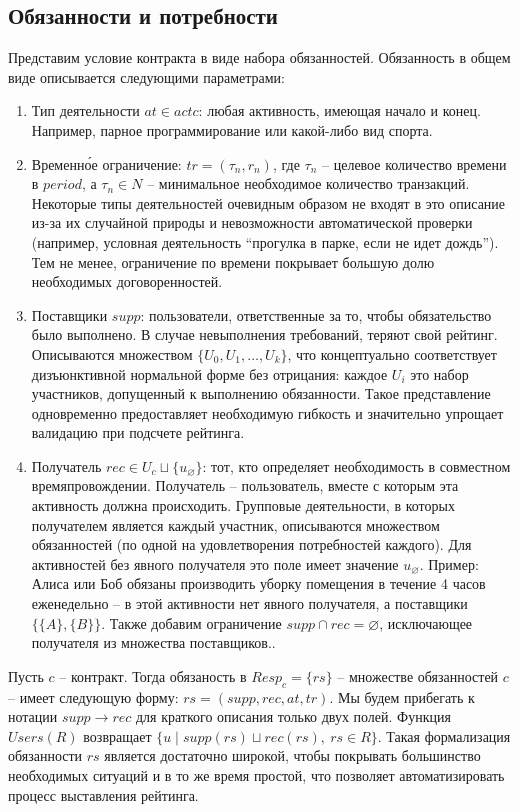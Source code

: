\documentclass[specification,annotation]{itmo-student-thesis}
\begin{document}
\subsection{Обязанности и потребности}

Представим условие контракта в виде набора обязанностей. Обязанность в
общем виде описывается следующими параметрами:

\begin{enumerate}
\item Тип деятельности $at \in actc$: любая активность, имеющая начало
  и конец. Например, парное программирование или какой-либо вид
  спорта.
\item Временн\'{о}е ограничение: $tr = (\tau_n, r_n)$, где $\tau_n$ --
  целевое количество времени в $period$, а $\tau_n \in N$ --
  минимальное необходимое количество транзакций. Некоторые типы
  деятельностей очевидным образом не входят в это описание из-за их
  случайной природы и невозможности автоматической проверки (например,
  условная деятельность ``прогулка в парке, если не идет дождь''). Тем
  не менее, ограничение по времени покрывает большую долю необходимых
  договоренностей.
\item Поставщики $supp$: пользователи, ответственные за то, чтобы
  обязательство было выполнено. В случае невыполнения требований,
  теряют свой рейтинг. Описываются множеством $\{U_0,
  U_1,\ldots,U_k\}$, что концептуально соответствует
  дизъюнктивной нормальной форме без отрицания: каждое $U_i$ это
  набор участников, допущенный к выполнению обязанности. Такое
  представление одновременно предоставляет необходимую гибкость и
  значительно упрощает валидацию при подсчете рейтинга.
\item Получатель $rec \in U_c \sqcup \{u_{\varnothing}\}$: тот, кто
  определяет необходимость в совместном времяпровождении. Получатель
  -- пользователь, вместе с которым эта активность должна
  происходить. Групповые деятельности, в которых получателем является
  каждый участник, описываются множеством обязанностей (по одной на
  удовлетворения потребностей каждого). Для активностей без явного
  получателя это поле имеет значение $u_{\varnothing}$. Пример: Алиса
  или Боб обязаны производить уборку помещения в течение 4 часов
  еженедельно -- в этой активности нет явного получателя, а поставщики
  $\{\{A\}, \{B\}\}$. Также добавим ограничение $supp \cap rec =
  \varnothing$, исключающее получателя из множества поставщиков..
\end{enumerate}

Пусть $c$ -- контракт. Тогда обязаность в $Resp_c = \{rs\} $ --
множестве обязанностей $c$ -- имеет следующую форму: $rs = (supp, rec,
at, tr)$. Мы будем прибегать к нотации $supp \rightarrow rec$ для
краткого описания только двух полей. Функция $Users(R)$ возвращает $\{
u \mid supp(rs) \sqcup rec(rs), \ rs \in R \}$. Такая формализация
обязанности $rs$ является достаточно широкой, чтобы покрывать
большинство необходимых ситуаций и в то же время простой, что
позволяет автоматизировать процесс выставления рейтинга.
\end{document}
